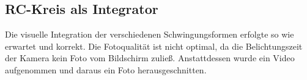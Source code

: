 \subsection{RC-Kreis als Integrator}
Die visuelle Integration der verschiedenen Schwingungsformen erfolgte so wie erwartet und korrekt. Die 
Fotoqualität ist nicht optimal, da die Belichtungszeit der Kamera kein Foto vom Bildschirm zuließ.
Anstattdessen wurde ein Video aufgenommen und daraus ein Foto herausgeschnitten.  